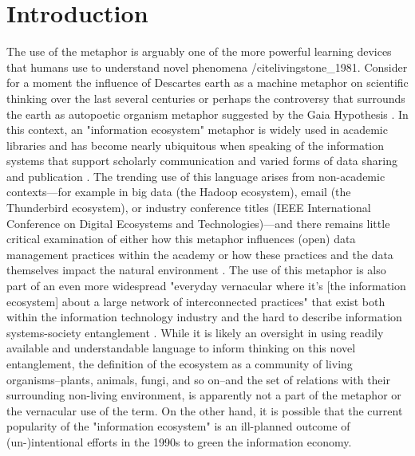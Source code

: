 \section{Introduction}

The use of the metaphor is arguably one of the more powerful learning devices that humans use to understand novel phenomena /cite{livingstone_1981}. Consider for a moment the influence of Descartes earth as a machine metaphor on scientific thinking over the last several centuries \cite{abram_1991} or perhaps the controversy that surrounds the earth as autopoetic organism metaphor suggested by the Gaia Hypothesis \cite{lovelock_1974}. In this context, an "information ecosystem" metaphor is widely used in academic libraries and has become nearly ubiquitous when speaking of the information systems that support scholarly communication and varied forms of data sharing and publication \cite[for example see][]{scott_2008}. The trending use of this language arises from non-academic contexts—for example in big data (the Hadoop ecosystem), email (the Thunderbird ecosystem), or industry conference titles (IEEE International Conference on Digital Ecosystems and Technologies)—and there remains little critical examination of either how this metaphor influences (open) data management practices within the academy or how these practices and the data themselves impact the natural environment \cite[although see][]{stepp_1999}. The use of this metaphor is also part of an even more widespread "everyday vernacular where it’s [the information ecosystem] about a large network of interconnected practices" that exist both within the information technology industry and the hard to describe information systems-society entanglement \cite{boyd_2016}. While it is likely an oversight in using readily available and understandable language to inform thinking on this novel entanglement, the definition of the ecosystem as a community of living organisms--plants, animals, fungi, and so on--and the set of relations with their surrounding non-living environment, is apparently not a part of the metaphor or the vernacular use of the term. On the other hand, it is possible that the current popularity of the "information ecosystem" is an ill-planned outcome of (un-)intentional efforts in the 1990s to green the information economy.

